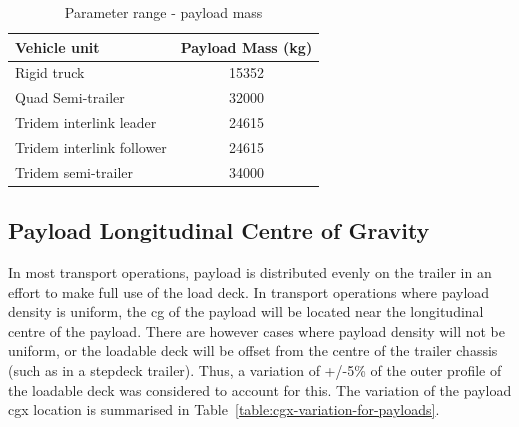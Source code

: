 \begin{table}[H]
	\centering\footnotesize
	\begin{threeparttable}

		\begin{tabulary}{\textwidth}{lc}
			\toprule
			\textbf{Vehicle unit} & \textbf{Payload Mass (kg)} \\
			\midrule
			Rigid truck & 15352 \\
			Quad Semi-trailer & 32000 \\
			Tridem interlink leader & 24615 \\
			Tridem interlink follower & 24615 \\
			Tridem semi-trailer & 34000 \\

			\bottomrule
		\end{tabulary}

		\caption{Parameter range - payload mass}
		\label{table:parameter-range-payload-masses}


	\end{threeparttable}
\end{table}

\subsection{Payload Longitudinal Centre of Gravity}\label{section:pr-cgx-payload}

In most transport operations, payload is distributed evenly on the trailer in an effort to make full use of the load deck. In transport operations where payload density is uniform, the \gls{cg} of the payload will be located near the longitudinal centre of the payload. There are however cases where payload density will not be uniform, or the loadable deck will be offset from the centre of the trailer chassis (such as in a stepdeck trailer). Thus, a variation of +/-5\% of the outer profile of the loadable deck was considered to account for this. The variation of the payload \gls{cgx} location is summarised in Table~\ref{table:cgx-variation-for-payloads}.

